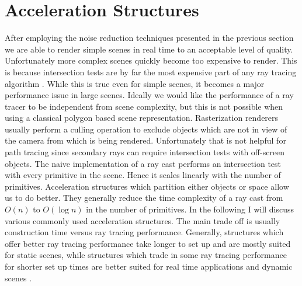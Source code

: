 \documentclass{ACGSeminar}
\begin{document}
\section{Acceleration Structures} \label{acceleration}
After employing the noise reduction techniques presented in the previous section we are able to render simple scenes in real time to an acceptable level of quality. Unfortunately more complex scenes quickly become too expensive to render. This is because intersection tests are by far the most expensive part of any ray tracing algorithm \cite[7]{Whitted:1980}. While this is true even for simple scenes, it becomes a major performance issue in large scenes. Ideally we would like the performance of a ray tracer to be independent from scene complexity, but this is not possible when using a classical polygon based scene representation.
Rasterization renderers usually perform a culling operation to exclude objects which are not in view of the camera from which is being rendered. Unfortunately that is not helpful for path tracing since secondary rays can require intersection tests with off-screen objects.
The naive implementation of a ray cast performs an intersection test with every primitive in the scene. Hence it scales linearly with the number of primitives. Acceleration structures which partition either objects or space allow us to do better. They generally reduce the time complexity of a ray cast from $O(n)$ to $O(\log n)$ in the number of primitives. In the following I will discuss various commonly used acceleration structures. The main trade off is usually construction time versus ray tracing performance. Generally, structures which offer better ray tracing performance take longer to set up and are mostly suited for static scenes, while structures which trade in some ray tracing performance for shorter set up times are better suited for real time applications and dynamic scenes \cite{Karras:2012:MPC:2383795.2383801}.
\end{document}
